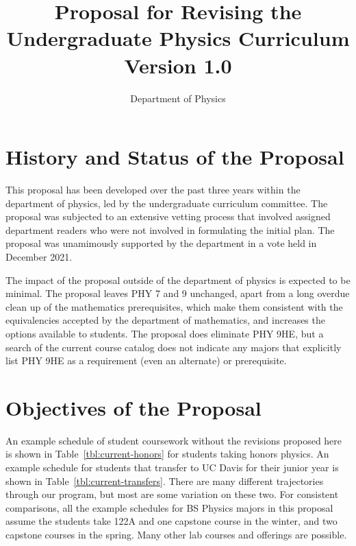 \documentclass[12pt]{article}
\begin{document}

\title{Proposal for Revising the \\ Undergraduate Physics Curriculum \\ Version 1.0}
\author{Department of Physics}

\maketitle

\section{History and Status of the Proposal}

This proposal has been developed over the past three years within the
department of physics, led by the undergraduate curriculum committee.
The proposal was subjected to an extensive vetting process that
involved assigned department readers who were not involved in
formulating the initial plan.  The proposal was unamimously supported
by the department in a vote held in December 2021.

The impact of the proposal outside of the department of physics is
expected to be minimal. The proposal leaves PHY 7 and 9 unchanged,
apart from a long overdue clean up of the mathematics prerequisites,
which make them consistent with the equivalencies accepted by the
department of mathematics, and increases the options available to
students.  The proposal does eliminate PHY 9HE, but a search of the
current course catalog does not indicate any majors that explicitly
list PHY 9HE as a requirement (even an alternate) or prerequisite.

\section{Objectives of the Proposal}

An example schedule of student coursework without the revisions
proposed here is shown in Table~\ref{tbl:current-honors} for students
taking honors physics.  An example schedule for students that transfer
to UC Davis for their junior year is shown in
Table~\ref{tbl:current-transfers}.  There are many different
trajectories through our program, but most are some variation on these
two.  For consistent comparisons, all the example schedules for BS
Physics majors in this proposal assume the students take 122A and one
capstone course in the winter, and two capstone courses in the spring.
Many other lab courses and offerings are possible.
\end{document}
